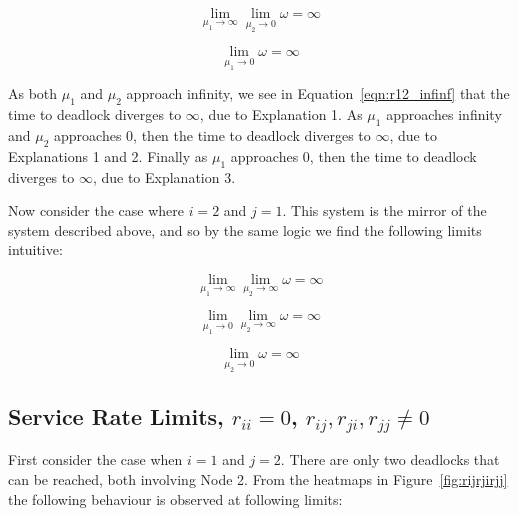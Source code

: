 \documentclass{article}
\begin{document}
\begin{equation}\label{eqn:r12_inf0}
\lim_{\mu_1 \to \infty} \lim_{\mu_2 \to 0} \omega = \infty
\end{equation}

\begin{equation}\label{eqn:r12_0_}
\lim_{\mu_1 \to 0} \omega = \infty
\end{equation}

As both $\mu_1$ and $\mu_2$ approach infinity, we see in Equation~\ref{eqn:r12_infinf} that the time to deadlock diverges to $\infty$, due to Explanation 1.
As $\mu_1$ approaches infinity and $\mu_2$ approaches $0$, then the time to deadlock diverges to $\infty$, due to Explanations 1 and 2.
Finally as $\mu_1$ approaches $0$, then the time to deadlock diverges to $\infty$, due to Explanation 3.

Now consider the case where $i = 2$ and $j = 1$.
This system is the mirror of the system described above, and so by the same logic we find the following limits intuitive:

\begin{equation}\label{eqn:r21_infinf}
\lim_{\mu_1 \to \infty} \lim_{\mu_2 \to \infty} \omega = \infty
\end{equation}

\begin{equation}\label{eqn:r21_inf0}
\lim_{\mu_1 \to 0} \lim_{\mu_2 \to \infty} \omega = \infty
\end{equation}

\begin{equation}\label{eqn:r21_0_}
\lim_{\mu_2 \to 0} \omega = \infty
\end{equation}


\subsection{Service Rate Limits, $r_{ii} = 0$, $r_{ij}, r_{ji}, r_{jj} \neq 0$}\label{sec:rijrjirjj}

First consider the case when $i = 1$ and $j = 2$. There are only two deadlocks that can be reached, both involving Node 2.
From the heatmaps in Figure~\ref{fig:rijrjirjj} the following behaviour is observed at following limits:
\end{document}

